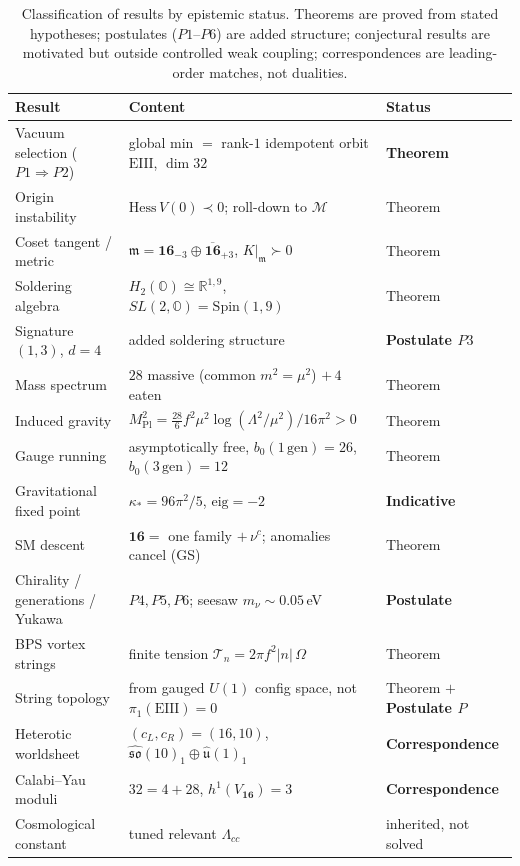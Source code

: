 \begin{table}[h]
\centering
\renewcommand{\arraystretch}{1.25}
\begin{tabular}{lll}
\hline
\textbf{Result} & \textbf{Content} & \textbf{Status}\\
\hline
Vacuum selection ($P1\Rightarrow P2$)
  & global min $=$ rank-$1$ idempotent orbit $\mathrm{EIII}$, $\dim 32$
  & \textbf{Theorem}\\
Origin instability
  & $\mathrm{Hess}\,V(0)\prec0$; roll-down to $\mathcal{M}$
  & Theorem\\
Coset tangent / metric
  & $\mathfrak m=\mathbf{16}_{-3}\oplus\overline{\mathbf{16}}_{+3}$, $K|_{\mathfrak m}\succ0$
  & Theorem\\
Soldering algebra
  & $H_{2}(\mathbb{O})\cong\mathbb{R}^{1,9}$, $SL(2,\mathbb{O})=\mathrm{Spin}(1,9)$
  & Theorem\\
Signature $(1,3)$, $d=4$
  & added soldering structure
  & \textbf{Postulate $P3$}\\
Mass spectrum
  & $28$ massive (common $m^{2}=\mu^{2}$) $+\,4$ eaten
  & Theorem\\
Induced gravity
  & $M_{\mathrm{Pl}}^{2}=\tfrac{28}{6}f^{2}\mu^{2}\log(\Lambda^{2}/\mu^{2})/16\pi^{2}>0$
  & Theorem\\
Gauge running
  & asymptotically free, $b_{0}(1\,\mathrm{gen})=26$, $b_{0}(3\,\mathrm{gen})=12$
  & Theorem\\
Gravitational fixed point
  & $\kappa_{\ast}=96\pi^{2}/5$, $\mathrm{eig}=-2$
  & \textbf{Indicative}\\
SM descent
  & $\mathbf{16}=$ one family $+\,\nu^{c}$; anomalies cancel (GS)
  & Theorem\\
Chirality / generations / Yukawa
  & $P4,P5,P6$; seesaw $m_{\nu}\sim0.05$\,eV
  & \textbf{Postulate}\\
BPS vortex strings
  & finite tension $\mathcal{T}_{n}=2\pi f^{2}|n|\,\Omega$
  & Theorem\\
String topology
  & from gauged $U(1)$ config space, not $\pi_{1}(\mathrm{EIII})=0$
  & Theorem $+$ \textbf{Postulate $P$}\\
Heterotic worldsheet
  & $(c_{L},c_{R})=(16,10)$, $\widehat{\mathfrak{so}}(10)_{1}\oplus\widehat{\mathfrak u}(1)_{1}$
  & \textbf{Correspondence}\\
Calabi--Yau moduli
  & $32=4+28$, $h^{1}(V_{\mathbf{16}})=3$
  & \textbf{Correspondence}\\
Cosmological constant
  & tuned relevant $\Lambda_{cc}$
  & inherited, not solved\\
\hline
\end{tabular}
\caption{Classification of results by epistemic status. Theorems are
proved from stated hypotheses; postulates ($P1$--$P6$) are added
structure; conjectural results are motivated but outside controlled
weak coupling; correspondences are leading-order matches, not
dualities.}
\label{tab:strings:ledger}
\end{table}

